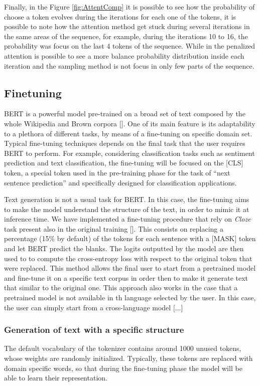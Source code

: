 \documentclass[10pt,twocolumn,letterpaper]{article}
\begin{document}
Finally, in the Figure \ref{fig:AttentComp} it is possible to see how the probability of choose a token evolves
during the iterations for each one of the tokens, it is possible to note how the attention method
get stuck during several iterations in the same areas of the sequence, for example, during the iterations
10 to 16, the probability was focus on the last 4 tokens of the sequence.
While in the penalized attention is possible to see a more balance probability distribution inside each iteration
and the sampling method is not focus in only few parts of the sequence.
\subsection{Finetuning}
BERT is a powerful model pre-trained on a broad set of text composed by the whole
Wikipedia and Brown corpora [].
One of its main feature is its adaptability to a plethora of different tasks,
by means of a fine-tuning on specific domain set.
Typical fine-tuning techniques depends on the final task that the user requires BERT to perform.
For example, considering classification tasks such as sentiment prediction and text classification,
the fine-tuning will be focused on the [CLS] token, a special token used in the pre-training phase for the task
of “next sentence prediction” and specifically designed for classification applications.

Text generation is not a usual task for BERT.
In this case, the fine-tuning aims to make the model understand the structure of the text,
in order to mimic it at inference time.
We have implemented a fine-tuning procedure that rely on \textit{Cloze} task present also in the original training [].
This consists on replacing a percentage (15\% by default) of the tokens for each sentence with a [MASK] token and let
BERT predict the blanks. The logits outputted by the model are then used to to compute the cross-entropy
loss with respect to the original token that were replaced.
This method allows the final user to start from a pretrained model and fine-tune it on a specific
text corpus in order then to make it generate text that similar to the original one.
This approach also works  in the case that a pretrained model is not available in th language selected by the user.
In this case, the user can simply start from a cross-language model [...]

\subsubsection{Generation of text with a specific structure}
The default vocabulary of the tokenizer contains around 1000 unused tokens, whose weights are randomly initialized.
Typically, these tokens are replaced with domain specific words, so that during the fine-tuning phase
the model will be able to learn their representation.
\end{document}
